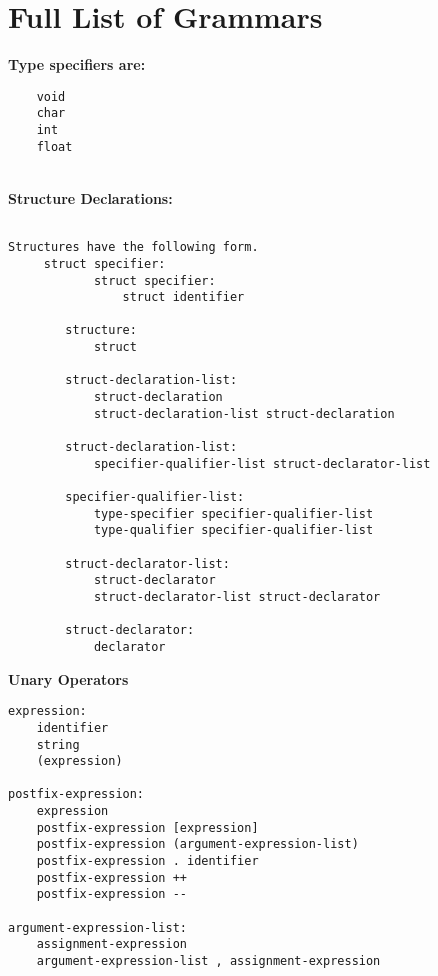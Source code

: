 \documentclass[./LRM_main.tex]{subfiles}
\begin{document}


\chapter{Full List of Grammars}

\quad \textbf {Type specifiers are:}
    \begin{lstlisting}
    void
    char
    int
    float
    \end{lstlisting}
    
\\\textbf{Structure Declarations:}
 \begin{lstlisting}
 
Structures have the following form.
     struct specifier:
            struct specifier:
                struct identifier
                
        structure:
            struct
            
        struct-declaration-list:
            struct-declaration
            struct-declaration-list struct-declaration
        
        struct-declaration-list:
            specifier-qualifier-list struct-declarator-list
        
        specifier-qualifier-list:
            type-specifier specifier-qualifier-list
            type-qualifier specifier-qualifier-list
        
        struct-declarator-list:
            struct-declarator
            struct-declarator-list struct-declarator
        
        struct-declarator:
            declarator
\end{lstlisting}

\textbf{Unary Operators}    
\begin{lstlisting}
expression:
    identifier
    string
    (expression)

postfix-expression:
    expression
    postfix-expression [expression]
    postfix-expression (argument-expression-list)
    postfix-expression . identifier
    postfix-expression ++
    postfix-expression --
    
argument-expression-list:
    assignment-expression
    argument-expression-list , assignment-expression
\end{lstlisting}





\end{document}
